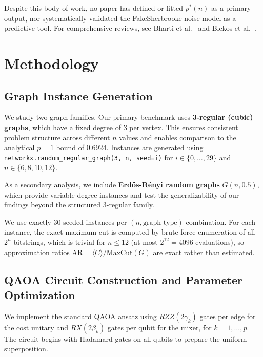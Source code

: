 \documentclass[12pt]{article}
\begin{document}
Despite this body of work, no paper has defined or fitted $p^*(n)$ as a primary output, nor systematically validated the FakeSherbrooke noise model as a predictive tool. For comprehensive reviews, see Bharti et al.\ \cite{bharti2022noisy} and Blekos et al.\ \cite{blekos2024review}.

\section{Methodology}

\subsection{Graph Instance Generation}

We study two graph families. Our primary benchmark uses \textbf{3-regular (cubic) graphs}, which have a fixed degree of 3 per vertex. This ensures consistent problem structure across different $n$ values and enables comparison to the analytical $p = 1$ bound of 0.6924. Instances are generated using \texttt{networkx.random\_regular\_graph(3, n, seed=i)} for $i \in \{0, \ldots, 29\}$ and $n \in \{6, 8, 10, 12\}$.

As a secondary analysis, we include \textbf{Erd\H{o}s-R\'enyi random graphs} $G(n, 0.5)$, which provide variable-degree instances and test the generalizability of our findings beyond the structured 3-regular family.

We use exactly 30 seeded instances per $(n, \text{graph type})$ combination. For each instance, the exact maximum cut is computed by brute-force enumeration of all $2^n$ bitstrings, which is trivial for $n \leq 12$ (at most $2^{12} = 4096$ evaluations), so approximation ratios $\text{AR} = \langle C \rangle / \text{MaxCut}(G)$ are exact rather than estimated.

\subsection{QAOA Circuit Construction and Parameter Optimization}

We implement the standard QAOA ansatz using $RZZ(2\gamma_k)$ gates per edge for the cost unitary and $RX(2\beta_k)$ gates per qubit for the mixer, for $k = 1, \ldots, p$. The circuit begins with Hadamard gates on all qubits to prepare the uniform superposition.
\end{document}
